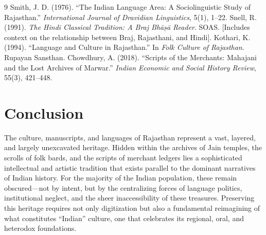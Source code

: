 \documentclass[12pt]{article}
\begin{document}
\begin{thebibliography}{9}
Smith, J. D. (1976). “The Indian Language Area: A Sociolinguistic Study of Rajasthan.” \textit{International Journal of Dravidian Linguistics}, 5(1), 1–22.
Snell, R. (1991). \textit{The Hindi Classical Tradition: A Braj Bhāṣā Reader}. SOAS. [Includes context on the relationship between Braj, Rajasthani, and Hindi].
Kothari, K. (1994). “Language and Culture in Rajasthan.” In \textit{Folk Culture of Rajasthan}. Rupayan Sansthan.
Chowdhury, A. (2018). “Scripts of the Merchants: Mahajani and the Lost Archives of Marwar.” \textit{Indian Economic and Social History Review}, 55(3), 421–448.
\end{thebibliography}

\section*{Conclusion}
The culture, manuscripts, and languages of Rajasthan represent a vast, layered, and largely unexcavated heritage. Hidden within the archives of Jain temples, the scrolls of folk bards, and the scripts of merchant ledgers lies a sophisticated intellectual and artistic tradition that exists parallel to the dominant narratives of Indian history. For the majority of the Indian population, these remain obscured—not by intent, but by the centralizing forces of language politics, institutional neglect, and the sheer inaccessibility of these treasures. Preserving this heritage requires not only digitization but also a fundamental reimagining of what constitutes “Indian” culture, one that celebrates its regional, oral, and heterodox foundations.
\end{document}
